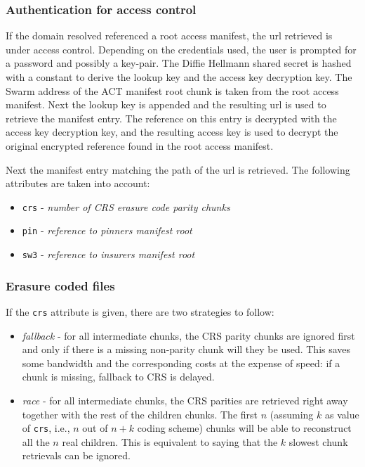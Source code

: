 \subsubsection{Authentication for access control}

If the domain resolved referenced a root access manifest, the url retrieved is under access control. 
Depending on the credentials used, the user is prompted for  a password and possibly a key-pair. 
The Diffie Hellmann shared secret is hashed with a constant to derive the lookup key and the access key decryption key. The Swarm address of the ACT manifest root chunk is taken from the root access manifest. 
 Next the lookup key is appended and the resulting url is used to retrieve the manifest entry. The reference on this entry is decrypted with the access key decryption key, and the resulting access key is used to decrypt the original encrypted reference found in the root access manifest.






Next the manifest entry matching the path of the url is retrieved. The following attributes are taken into account:

\begin{itemize}
    \item \texttt{crs} - \emph{number of CRS erasure code parity chunks}
    \item \texttt{pin} - \emph{reference to pinners manifest root} 
    \item \texttt{sw3} - \emph{reference to insurers manifest root} 
\end{itemize}


\subsubsection{Erasure coded files}

If the \texttt{crs} attribute is given, there are two strategies to follow: 

\begin{itemize}
\item \emph{fallback} - for all intermediate chunks, the CRS parity chunks are ignored first and only if there is a missing non-parity chunk will they be used. This saves some bandwidth and the corresponding costs at the expense of speed: if a chunk is missing, fallback to CRS is delayed.
\item \emph{race} -  for all intermediate chunks, the CRS parities are retrieved right away together with  the rest of the children chunks. The first $n$ (assuming $k$ as value of \texttt{crs}, i.e., $n$ out of $n+k$ coding scheme) chunks will be able to reconstruct all the $n$ real children. This is equivalent to saying that the $k$ slowest chunk retrievals can be ignored.  
\end{itemize}

